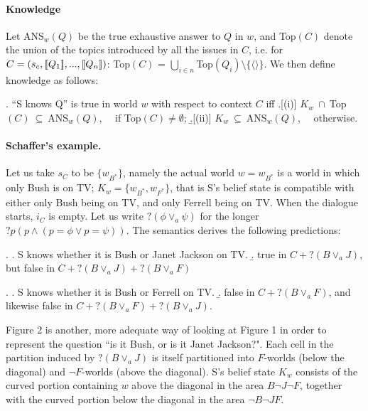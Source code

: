 \paragraph{Knowledge} Let ANS$_w(Q)$ be the true exhaustive answer to $Q$ in $w$, and Top$(C)$ denote the union of the topics introduced by  all  the issues in $C$, i.e.  for $C= (s_c,\lbrack\!\lbrack Q_1 \rbrack\!\rbrack, ..., \lbrack\!\lbrack Q_n \rbrack\!\rbrack)$:
Top$(C)$ = $\bigcup_{i\in n} $Top$(Q_i) \setminus \{\langle \rangle\}$.
We then define knowledge as follows:

\ex. ``S knows Q'' is true in world $w$ with respect to context $C$ iff 
\a.[(i)] $K_w \ \cap\ $Top$(C) \ \subseteq \ $ANS$_w(Q)$,  \ \ if  Top$(C)\neq\emptyset$; 
\b.[(ii)] $K_w   \ \subseteq \ $ANS$_w(Q)$,  \ \ otherwise.


  


 




\paragraph{Schaffer's example.} Let us take $s_C$ to be $\{w_{B^{*}}\}$, namely
the actual world $w=w_{B^{*}}$ is a world in which only Bush is on
TV; $K_w= \{w_{B^{*}}, w_{F^{*}}\}$, that is S's belief state is
compatible with either only Bush being on TV, and only Ferrell
being on TV. When the dialogue starts,  $i_C$   is empty. Let us write $ ?(\phi \vee_a \psi)$   for the longer  $?p ( p \wedge (p=\phi \vee p=\psi))$. The semantics
derives the following predictions:

\ex. \a. S knows whether it is Bush or Janet Jackson on TV. \b.
true in $C + ?(B \vee_a J)$, but false in $C +  ? (B \vee_a J) + ?
(B \vee_a F)$

\ex. \a. S knows whether it is Bush or Ferrell on TV. \b. false in
$C + ?(B \vee_a F)$, and likewise false in $C + ?(B \vee_a F) +
?(B\vee_a J)$.

\enlargethispage{1cm}



Figure 2 is another, more adequate way of looking at Figure 1 in
order to represent the question ``is it Bush, or is it Janet
Jackson?". Each cell in the partition induced by $?(B\vee_{a} J)$
is itself partitioned into $F$-worlds (below the diagonal) and
$\neg F$-worlds (above the diagonal). S's belief state $K_w$
consists of the curved portion containing $w$ above the diagonal
in the area $B\neg J \neg F$, together with the curved portion
below the diagonal in the area $\neg B \neg J F$.

